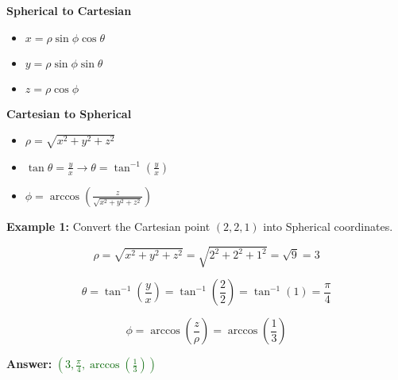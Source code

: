 \documentclass[10pt]{article}                               %
\begin{document}
\begin{adjustwidth}{2em}{0pt}
\begin{adjustwidth}{2em}{0pt}
\begin{notebox}
        \end{notebox}

        \vspace{0.5em}

        \textbf{Spherical to Cartesian}

            \begin{itemize}
                \item \( x = \rho\sin\phi\cos\theta \)
                \item \( y = \rho\sin\phi\sin\theta \)
                \item \( z = \rho\cos\phi \)
            \end{itemize}

            \vspace{0.5em}

            \textbf{Cartesian to Spherical}

            \begin{itemize}
                \item \( \rho = \sqrt{x^2 + y^2 + z^2} \)
                \item \( \tan\theta = \frac{y}{x}  \rightarrow  \theta = \tan^{-1}\left(\frac{y}{x}\right) \)
                \item \( \phi = \arccos\left(\frac{z}{\sqrt{x^2 + y^2 + z^2}}\right) \)
            \end{itemize}

            \begin{examplebox}
        
                \textbf{Example 1:} Convert the Cartesian point \( \left(2,2,1\right) \) into Spherical coordinates.
                \vspace{0.5em}

                \begin{adjustwidth}{2em}{0pt}

                    \[ \rho = \sqrt{x^2 + y^2 + z^2} = \sqrt{2^2 + 2^2 + 1^2} = \sqrt{9} = 3 \]

                    \[ \theta = \tan^{-1}\left(\frac{y}{x}\right) = \tan^{-1}\left(\frac{2}{2}\right) = \tan^{-1}(1) = \frac{\pi}{4} \]

                    \[ \phi = \arccos\left(\frac{z}{\rho}\right) = \arccos\left(\frac{1}{3}\right) \]

                    \textbf{Answer:} \textcolor{darkgreen}{\( \left(3, \frac{\pi}{4}, \arccos\left(\frac{1}{3}\right)\right) \)}


\end{adjustwidth}
\end{examplebox}
\end{adjustwidth}
\end{adjustwidth}
\end{document}
